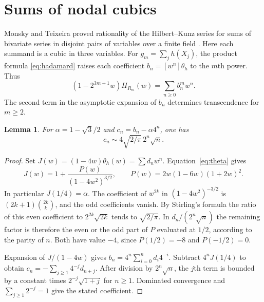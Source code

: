 \documentclass[11pt,a4paper,reqno]{amsart}
\numberwithin{equation}{section}
\theoremstyle{plain}
\newtheorem{lemma}[theorem]{Lemma}
\begin{document}
\section{Sums of nodal cubics}\label{sec:repeated}

Monsky and Teixeira proved rationality of the Hilbert--Kunz series for sums of bivariate series in disjoint pairs of variables over a finite field \cite{MTII}. Here each summand is a cubic in three variables. For $g_m=\sum_j h(X_j)$, the product formula \eqref{eq:hadamard} raises each coefficient $b_n=[w^n]\theta_h$ to the $m$th power. Thus
\begin{equation}\label{eq:repeated}
 (1-2^{3m+1}w)H_{R_m}(w)=\sum_{n\ge0}b_n^m w^n .
\end{equation}
The second term in the asymptotic expansion of $b_n$ determines transcendence for $m\ge2$.

\begin{lemma}\label{lem:secondterm}
For $\alpha=1-\sqrt3/2$ and $c_n=b_n-\alpha4^n$, one has
\[
 c_n\sim 4\sqrt{2/\pi}\,2^n\sqrt n .
\]
\end{lemma}
\begin{proof}
Set $J(w)=(1-4w)\theta_h(w)=\sum d_n w^n$. Equation~\eqref{eq:theta} gives
\[
 J(w)=1+\frac{P(w)}{(1-4w^2)^{3/2}},\qquad
 P(w)=2w(1-6w)(1+2w)^2 .
\]
In particular $J(1/4)=\alpha$. The coefficient of $w^{2k}$ in $(1-4w^2)^{-3/2}$ is $(2k+1)\binom{2k}{k}$, and the odd coefficients vanish. By Stirling's formula the ratio of this even coefficient to $2^{2k}\sqrt{2k}$ tends to $\sqrt{2/\pi}$. In $d_n/(2^n\sqrt n)$ the remaining factor is therefore the even or the odd part of $P$ evaluated at $1/2$, according to the parity of $n$. Both have value $-4$, since $P(1/2)=-8$ and $P(-1/2)=0$.

Expansion of $J/(1-4w)$ gives $b_n=4^n\sum_{i=0}^n d_i4^{-i}$. Subtract $4^n J(1/4)$ to obtain $c_n=-\sum_{j\ge1}4^{-j}d_{n+j}$. After division by $2^n\sqrt n$, the $j$th term is bounded by a constant times $2^{-j}\sqrt{1+j}$ for $n\ge1$. Dominated convergence and $\sum_{j\ge1}2^{-j}=1$ give the stated coefficient.
\end{proof}
\end{document}
